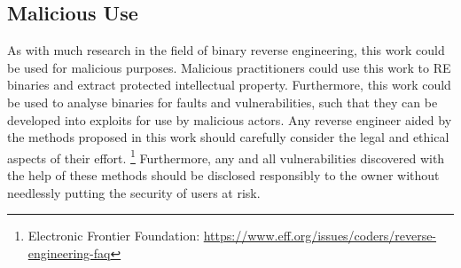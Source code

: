 \subsection{Malicious Use}
As with much research in the field of binary reverse engineering, this work could be used for malicious purposes. Malicious practitioners could use this work to RE binaries and extract protected intellectual property. Furthermore, this work could be used to analyse binaries for faults and vulnerabilities, such that they can be developed into exploits for use by malicious actors. Any reverse engineer aided by the methods proposed in this work should carefully consider the legal and ethical aspects of their effort.  \footnote{Electronic Frontier Foundation: \url{https://www.eff.org/issues/coders/reverse-engineering-faq}} Furthermore, any and all vulnerabilities discovered with the help of these methods should be disclosed responsibly to the owner without needlessly putting the security of users at risk. 